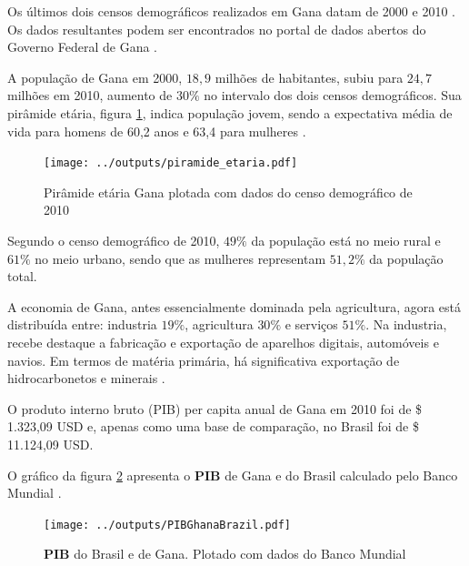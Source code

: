 Os últimos dois censos demográficos realizados em Gana datam
de 2000 \citep{ghanacensus2003} e 2010 \citep{ghanacensus2013}. Os
dados resultantes podem ser encontrados no portal de dados abertos
do Governo Federal de Gana \citep{opendataghana}.

A população de Gana em 2000, $18,9$ milhões de habitantes, subiu para $24,7$ 
milhões em 2010, aumento de $30\%$ no intervalo dos dois censos demográficos. 
Sua pirâmide etária, figura \ref{fig:piramedegana}, indica população 
jovem, sendo a expectativa média de vida para homens de 60,2 anos e 
63,4 para mulheres \citep{ghanacensus2013}.

\begin{figure}[H]
  \centering
  \texttt{[image: ../outputs/piramide\_etaria.pdf]}
  \caption{Pirâmide etária Gana plotada com dados do censo 
           demográfico de 2010 \citep{ghanacensus2013} \label{fig:piramedegana}}
\end{figure}

Segundo o censo demográfico de 2010, $49\%$ da população está no meio rural e 
$61\%$ no meio urbano, sendo que as mulheres representam $51,2\%$ da população
total.

A economia de Gana, antes essencialmente dominada pela agricultura, 
agora está distribuída entre: industria $19\%$, agricultura $30\%$ 
e serviços $51\%$. Na industria, recebe destaque a fabricação e 
exportação de aparelhos digitais, automóveis e navios. 
Em termos de matéria primária, há significativa exportação de 
hidrocarbonetos e minerais \citep{ghanacensus2013}.
 
 
 

O produto interno bruto (PIB) per capita anual de Gana em 2010 foi
de \$ 1.323,09 USD e, apenas como uma base de comparação, no Brasil 
foi de \$ 11.124,09 USD.


O gráfico da figura \ref{fg:pib} apresenta o \textbf{PIB} de Gana e do Brasil 
calculado pelo Banco Mundial \citep{bancomundial}.

\begin{figure}[H]
\begin{center}
  \texttt{[image: ../outputs/PIBGhanaBrazil.pdf]}
  \caption{\textbf{PIB} do Brasil e de Gana. Plotado com dados do 
           Banco Mundial \citep{bancomundial} \label{fg:pib}}
\end{center}
\end{figure}


